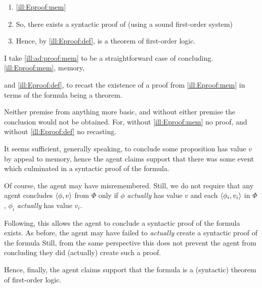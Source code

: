 \begin{note}
  \begin{illustration}[\adA{}]
    \label{ill:ad:proof:mem}
    \mbox{}
    \vspace{-\baselineskip}
    \begin{enumerate}[%
      label=\arabic*.,%
      ref=({I}.{\ref{ill:ad:proof:mem}}:\arabic*)%
      ]
    \item
      \illEproofMem{} \hfill \ref{ill:Eproof:mem}
    \item
      \label{ill:Eproof:exP}
      So, there exists a syntactic proof of  (using a sound first-order system)
    \item
      \label{ill:Eproof:thm}
      Hence, by \ref{ill:Eproof:def},  is a theorem of first-order logic.
    \end{enumerate}
    \vspace{-\baselineskip}
  \end{illustration}
\end{note}

\begin{note}
  I take \autoref{ill:ad:proof:mem} to be a straightforward case of concluding.
  \ref{ill:Eproof:mem}, memory,


  and \ref{ill:Eproof:def}, to recast the existence of a proof from \ref{ill:Eproof:mem} in terms of the formula being a theorem.

  Neither premise from anything more basic, and without either premise the conclusion would not be obtained.
  For, without \ref{ill:Eproof:mem} no proof, and without \ref{ill:Eproof:def} no recasting.
\end{note}

\begin{note}
  It seems sufficient, generally speaking, to conclude some proposition has value \(v\) by appeal to memory, hence the agent claims support that there was some event which culminated in a syntactic proof of the formula.

  Of course, the agent may have misremembered.
  Still, we do not require that any agent concludes \(\langle \phi, v \rangle\) from \(\Phi\) only if \(\phi\) \emph{actually} has value \(v\) and each \(\langle \phi_{i}, v_{i} \rangle\) in \(\Phi\), \(\phi_{i}\) \emph{actually} has value \(v_{i}\).

  Following, this allows the agent to conclude a syntactic proof of the formula exists.
  As before, the agent may have failed to \emph{actually} create a syntactic proof of the formula
  Still, from the same perspective this does not prevent the agent from concluding they did (actually) create such a proof.

  Hence, finally, the agent claims support that the formula is a (syntactic) theorem of first-order logic.
\end{note}

